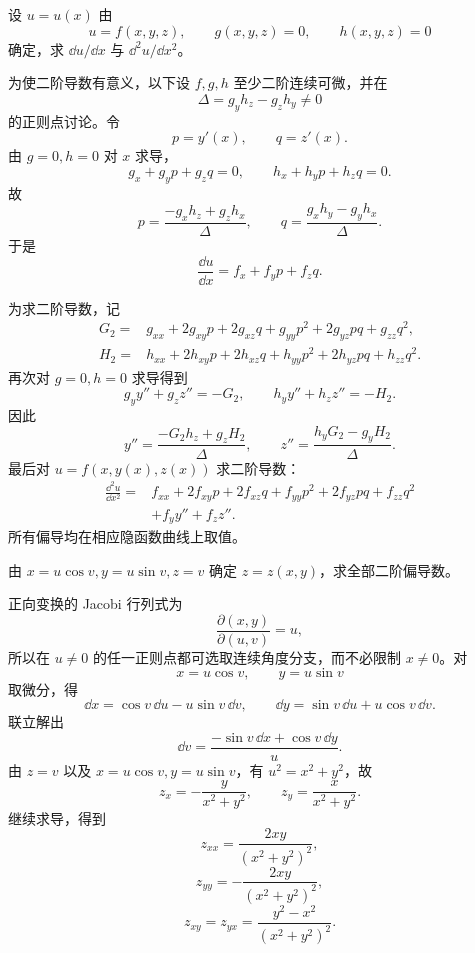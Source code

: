 \begin{xexercise}[20.2.5 练习题 5]
设 $u=u(x)$ 由
\[
  u=f(x,y,z),\qquad g(x,y,z)=0,\qquad h(x,y,z)=0
\]
确定，求 $\dd u/\dd x$ 与 $\dd^2u/\dd x^2$。
\end{xexercise}
\begin{xsolution}
为使二阶导数有意义，以下设 $f,g,h$ 至少二阶连续可微，并在
\[
  \Delta=g_yh_z-g_zh_y\ne0
\]
的正则点讨论。令
\[
  p=y'(x),\qquad q=z'(x).
\]
由 $g=0,h=0$ 对 $x$ 求导，
\[
  g_x+g_yp+g_zq=0,
  \qquad
  h_x+h_yp+h_zq=0.
\]
故
\[
  p=\frac{-g_xh_z+g_zh_x}{\Delta},
  \qquad
  q=\frac{g_xh_y-g_yh_x}{\Delta}.
\]
于是
\[
  \boxed{\displaystyle
    \frac{\dd u}{\dd x}=f_x+f_yp+f_zq}.
\]

为求二阶导数，记
\begin{align*}
  G_2={}&g_{xx}+2g_{xy}p+2g_{xz}q
       +g_{yy}p^2+2g_{yz}pq+g_{zz}q^2,\\
  H_2={}&h_{xx}+2h_{xy}p+2h_{xz}q
       +h_{yy}p^2+2h_{yz}pq+h_{zz}q^2.
\end{align*}
再次对 $g=0,h=0$ 求导得到
\[
  g_y y''+g_z z''=-G_2,
  \qquad
  h_y y''+h_z z''=-H_2.
\]
因此
\[
  y''=\frac{-G_2h_z+g_zH_2}{\Delta},
  \qquad
  z''=\frac{h_yG_2-g_yH_2}{\Delta}.
\]
最后对 $u=f(x,y(x),z(x))$ 求二阶导数：
\[
  \boxed{\begin{aligned}
  \frac{\dd^2u}{\dd x^2}
  ={}&f_{xx}+2f_{xy}p+2f_{xz}q
      +f_{yy}p^2+2f_{yz}pq+f_{zz}q^2\\
     &+f_y y''+f_z z''.
  \end{aligned}}
\]
所有偏导均在相应隐函数曲线上取值。
\end{xsolution}

\begin{xexercise}[20.2.5 练习题 6]
由 $x=u\cos v,y=u\sin v,z=v$ 确定 $z=z(x,y)$，求全部二阶偏导数。
\end{xexercise}
\begin{xsolution}
正向变换的 Jacobi 行列式为
\[
  \frac{\partial(x,y)}{\partial(u,v)}=u,
\]
所以在 $u\ne0$ 的任一正则点都可选取连续角度分支，而不必限制 $x\ne0$。对
\[
  x=u\cos v,\qquad y=u\sin v
\]
取微分，得
\[
  \dd x=\cos v\,\dd u-u\sin v\,\dd v,
  \qquad
  \dd y=\sin v\,\dd u+u\cos v\,\dd v.
\]
联立解出
\[
  \dd v=\frac{-\sin v\,\dd x+\cos v\,\dd y}{u}.
\]
由 $z=v$ 以及 $x=u\cos v,y=u\sin v$，有 $u^2=x^2+y^2$，故
\[
  z_x=-\frac{y}{x^2+y^2},
  \qquad
  z_y=\frac{x}{x^2+y^2}.
\]
继续求导，得到
\[
  \boxed{\displaystyle
    z_{xx}=\frac{2xy}{(x^2+y^2)^2}},
\]
\[
  \boxed{\displaystyle
    z_{yy}=-\frac{2xy}{(x^2+y^2)^2}},
\]
\[
  \boxed{\displaystyle
    z_{xy}=z_{yx}=\frac{y^2-x^2}{(x^2+y^2)^2}}.
\]
\end{xsolution}

